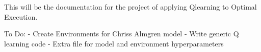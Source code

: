 This will be the documentation for the project of 
applying Qlearning to Optimal Execution.

To Do:
- Create Environments for Chriss Almgren model
- Write generic Q learning code
- Extra file for model and environment hyperparameters
